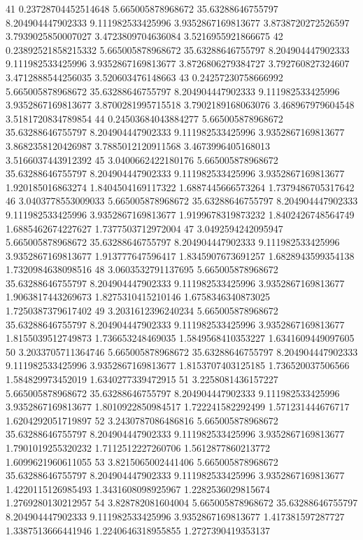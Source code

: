 {41 0.23728704452514648 5.665005878968672 35.63288646755797 8.204904447902333 9.111982533425996 3.9352867169813677 3.8738720272526597 3.7939025850007027 3.4723809704636084 3.5216955921866675
42 0.23892521858215332 5.665005878968672 35.63288646755797 8.204904447902333 9.111982533425996 3.9352867169813677 3.8726806279384727 3.792760827324607 3.4712888544256035 3.520603476148663
43 0.24257230758666992 5.665005878968672 35.63288646755797 8.204904447902333 9.111982533425996 3.9352867169813677 3.8700281995715518 3.7902189168063076 3.468967979604548 3.5181720834789854
44 0.24503684043884277 5.665005878968672 35.63288646755797 8.204904447902333 9.111982533425996 3.9352867169813677 3.8682358120426987 3.7885012120911568 3.4673996405168013 3.5166037443912392
45 3.0400662422180176 5.665005878968672 35.63288646755797 8.204904447902333 9.111982533425996 3.9352867169813677 1.920185016863274 1.8404504169117322 1.6887445666573264 1.7379486705317642
46 3.0403778553009033 5.665005878968672 35.63288646755797 8.204904447902333 9.111982533425996 3.9352867169813677 1.9199678319873232 1.8402426748564749 1.6885462674227627 1.7377503712972004
47 3.0492594242095947 5.665005878968672 35.63288646755797 8.204904447902333 9.111982533425996 3.9352867169813677 1.913777647596417 1.8345907673691257 1.6828943599354138 1.7320984638098516
48 3.0603532791137695 5.665005878968672 35.63288646755797 8.204904447902333 9.111982533425996 3.9352867169813677 1.9063817443269673 1.8275310415210146 1.6758346340873025 1.7250387379617402
49 3.2031612396240234 5.665005878968672 35.63288646755797 8.204904447902333 9.111982533425996 3.9352867169813677 1.8155039512749873 1.736653248469035 1.5849568410353227 1.6341609449097605
50 3.2033705711364746 5.665005878968672 35.63288646755797 8.204904447902333 9.111982533425996 3.9352867169813677 1.8153707403125185 1.736520037506566 1.584829973452019 1.6340277339472915
51 3.2258081436157227 5.665005878968672 35.63288646755797 8.204904447902333 9.111982533425996 3.9352867169813677 1.8010922850984517 1.722241582292499 1.571231444676717 1.6204292051719897
52 3.2430787086486816 5.665005878968672 35.63288646755797 8.204904447902333 9.111982533425996 3.9352867169813677 1.7901019255320232 1.7112512227260706 1.5612877860213772 1.6099621960611055
53 3.8215065002441406 5.665005878968672 35.63288646755797 8.204904447902333 9.111982533425996 3.9352867169813677 1.4220115126985493 1.3431608098925967 1.2282536029815674 1.2769280130212957
54 3.828782081604004 5.665005878968672 35.63288646755797 8.204904447902333 9.111982533425996 3.9352867169813677 1.417381597287727 1.3387513666441946 1.2240646318955855 1.2727390419353137
}

